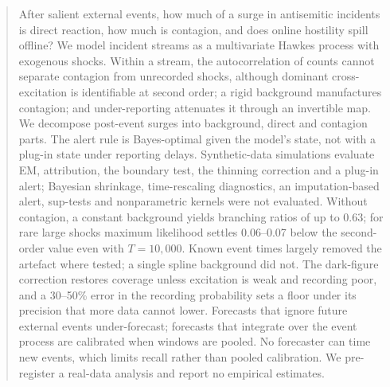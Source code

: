 \documentclass[11pt]{article}
\begin{document}
\begin{tcolorbox}[enhanced,breakable,colback=LabTint,frame hidden,boxrule=0pt,
  sharp corners,left=12pt,right=12pt,top=9pt,bottom=9pt,
  borderline west={2pt}{0pt}{LabNavy},before skip=4pt,after skip=12pt]
\begin{abstract}
After salient external events, how much of a surge in antisemitic incidents
is direct reaction, how much is contagion, and does online hostility spill
offline? We model incident streams as a multivariate Hawkes process with
exogenous shocks. Within a stream, the autocorrelation of counts cannot
separate contagion from unrecorded shocks, although dominant
cross-excitation is identifiable at second order; a rigid background
manufactures contagion; and under-reporting attenuates it through an
invertible map. We decompose post-event surges into background, direct and
contagion parts. The alert rule is Bayes-optimal given the model's state,
not with a plug-in state under reporting delays. Synthetic-data simulations
evaluate EM, attribution, the boundary test, the thinning correction and a
plug-in alert; Bayesian shrinkage, time-rescaling diagnostics, an
imputation-based alert, sup-tests and nonparametric kernels were not
evaluated. Without contagion, a constant background yields branching ratios
of up to 0.63; for rare large shocks maximum likelihood settles 0.06--0.07
below the second-order value even with $T=10{,}000$. Known event times
largely removed the artefact where tested; a single spline background did
not. The dark-figure correction restores coverage unless excitation is weak
and recording poor, and a 30--50\% error in the recording probability sets a floor under its precision that more data
cannot lower. Forecasts that ignore future external events under-forecast;
forecasts that integrate over the event process are calibrated when windows
are pooled. No forecaster can time new events, which limits recall rather
than pooled calibration. We pre-register a real-data analysis and report no
empirical estimates.
\end{abstract}
\end{tcolorbox}
\suppressfloats[t]
\end{document}
